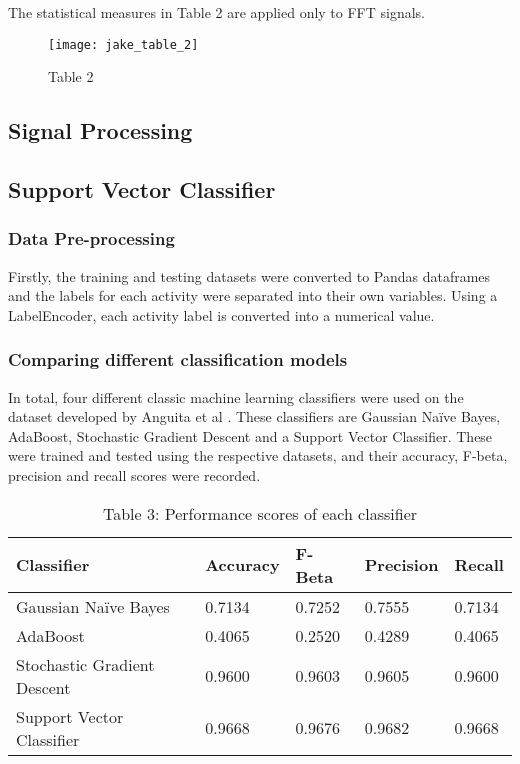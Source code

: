     The statistical measures in Table 2 are applied only to FFT signals.

    \begin{figure}[h]
        \centering
        \texttt{[image: jake\_table\_2]}\hfill
        \caption*{Table 2}
    \end{figure}

\subsection{Signal Processing}

\subsection{Support Vector Classifier}
\subsubsection{Data Pre-processing}
    Firstly, the training and testing datasets were converted to Pandas dataframes and the labels for each activity were separated into their own variables.
    Using a LabelEncoder, each activity label is converted into a numerical value.

\subsubsection{Comparing different classification models}
    In total, four different classic machine learning classifiers were used on the dataset developed by Anguita et al \cite{Anguita2012}. These classifiers are Gaussian Naïve Bayes,
    AdaBoost, Stochastic Gradient Descent and a Support Vector Classifier. These were trained and tested using the respective datasets, and their accuracy,
    F-beta, precision and recall scores were recorded.

    \begin{table}[ht]
        \centering\scriptsize
        \begin{tabular}{|l|l|l|l|l|}
            \hline
            \textbf{Classifier} & \textbf{Accuracy} & \textbf{F-Beta}  & \textbf{Precision} & \textbf{Recall} \\ \hline
            Gaussian Naïve Bayes             & 0.7134           & 0.7252  & 0.7555 & 0.7134 \\ \hline
            AdaBoost            & 0.4065           & 0.2520 & 0.4289 & 0.4065 \\ \hline
            Stochastic Gradient Descent               & 0.9600           & 0.9603 & 0.9605 & 0.9600 \\ \hline
            Support Vector Classifier            & 0.9668           & 0.9676 & 0.9682 & 0.9668 \\ \hline
        \end{tabular}
        \caption*{Table 3: Performance scores of each classifier}
    \end{table}

